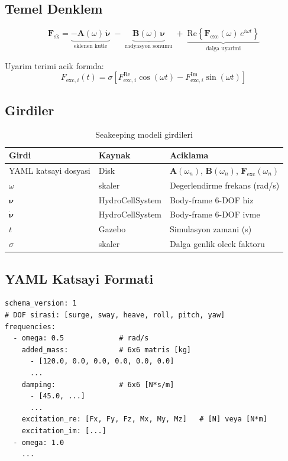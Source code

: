\documentclass[12pt,a4paper]{article}
\newcommand{\nuvec}{\boldsymbol{\nu}}
\newcommand{\nudot}{\dot{\boldsymbol{\nu}}}
\newcommand{\Fvec}{\mathbf{F}}
\newcommand{\Avec}{\mathbf{A}}
\newcommand{\Bvec}{\mathbf{B}}
\begin{document}
\subsection{Temel Denklem}

\begin{equation}
  \boxed{
  \Fvec_{\text{sk}}
    = \underbrace{-\Avec(\omega)\,\nudot}_{\text{eklenen kutle}}
    \;-\; \underbrace{\Bvec(\omega)\,\nuvec}_{\text{radyasyon sonumu}}
    \;+\; \underbrace{\text{Re}\!\left\{\Fvec_{\text{exc}}(\omega)\,e^{i\omega t}\right\}}_{\text{dalga uyarimi}}
  }
  \label{eq:seakeeping}
\end{equation}

Uyarim terimi acik formda:
\begin{equation}
  F_{\text{exc},i}(t)
    = \sigma\!\left[F_{\text{exc},i}^{\text{Re}}\cos(\omega t)
      - F_{\text{exc},i}^{\text{Im}}\sin(\omega t)\right]
  \label{eq:excitation}
\end{equation}

\subsection{Girdiler}

\begin{table}[H]
  \centering
  \caption{Seakeeping modeli girdileri}
  \begin{tabularx}{\linewidth}{llX}
    \toprule
    \textbf{Girdi} & \textbf{Kaynak} & \textbf{Aciklama} \\
    \midrule
    YAML katsayi dosyasi & Disk & $\Avec(\omega_n)$, $\Bvec(\omega_n)$, $\Fvec_{\text{exc}}(\omega_n)$ \\
    $\omega$ & skaler & Degerlendirme frekans (rad/s) \\
    $\nuvec$ & HydroCellSystem & Body-frame 6-DOF hiz \\
    $\nudot$ & HydroCellSystem & Body-frame 6-DOF ivme \\
    $t$ & Gazebo & Simulasyon zamani (s) \\
    $\sigma$ & skaler & Dalga genlik olcek faktoru \\
    \bottomrule
  \end{tabularx}
\end{table}

\subsection{YAML Katsayi Formati}

\begin{lstlisting}
schema_version: 1
# DOF sirasi: [surge, sway, heave, roll, pitch, yaw]
frequencies:
  - omega: 0.5             # rad/s
    added_mass:            # 6x6 matris [kg]
      - [120.0, 0.0, 0.0, 0.0, 0.0, 0.0]
      ...
    damping:               # 6x6 [N*s/m]
      - [45.0, ...]
      ...
    excitation_re: [Fx, Fy, Fz, Mx, My, Mz]   # [N] veya [N*m]
    excitation_im: [...]
  - omega: 1.0
    ...
\end{lstlisting}
\end{document}
